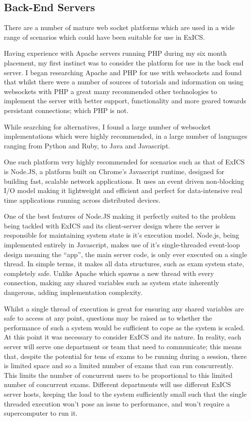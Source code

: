\subsection{Back-End Servers}
\label{subs:exics_backend_server}

There are a number of mature web socket platforms which are used in a wide range of scenarios which could have been suitable for use in ExICS.

Having experience with Apache servers running PHP during my six month placement, my first instinct was to consider the platform for use in the back end server.  I began researching Apache and PHP for use with websockets and found that whilst there were a number of sources of tutorials and information on using websockets with PHP a great many recommended other technologies to implement the server with better support, functionality and more geared towards persistant connections; which PHP is not.

While searching for alternatives, I found a large number of websocket implementations which were highly recommended, in a large number of languages ranging from Python and Ruby, to Java and Javascript.

One such platform very highly recommended for scenarios such as that of ExICS \cite{whyNodeJS} is Node.JS, a platform built on Chrome's Javascript runtime, designed for building fast, scalable network applications.  It uses an event driven non-blocking I/O model making it lightweight and efficient and perfect for data-intensive real time applications running across distributed devices.\cite{nodeJS}

One of the best features of Node.JS making it perfectly suited to the problem being tackled with ExICS and its client-server design where the server is responsible for maintaining system state is it's execution model.  Node.js, being implemented entirely in Javascript, makes use of it's single-threaded event-loop design meaning the ``app'', the main server code, is only ever executed on a single thread.\cite{understandingNodeEventLoop}  In simple terms, it makes all data structures, such as exam system state, completely safe.  Unlike Apache which spawns a new thread with every connection, making any shared variables such as system state inherently dangerous, adding implementation complexity.

Whilst a single thread of execution is great for ensuring any shared variables are safe to access at any point, questions may be raised as to whether the performance of such a system would be sufficient to cope as the system is scaled.  At this point it was necessary to consider ExICS and its nature.  In reality, each server will serve one department or team that need to communicate; this means that, despite the potential for tens of exams to be running during a session, there is limited space and so a limited number of exams that can run concurrently.  This limits the number of concurrent users to be proportional to this limited number of concurrent exams.  Different departments will use different ExICS server hosts, keeping the load to the system sufficiently small such that the single threaded execution won't pose an issue to performance, and won't require a supercomputer to run it.

